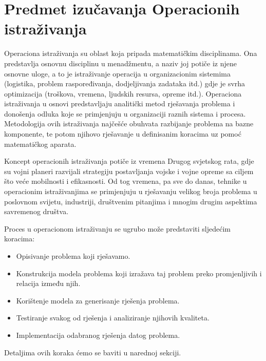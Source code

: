 \documentclass[a4paper, utf8, 11pt, colorlinks]{book}
\theoremstyle{definition}
\begin{document}
\chapter{Predmet izučavanja Operacionih istraživanja}


Operaciona istraživanja su oblast koja pripada matematičkim disciplinama. Ona predstavlja osnovnu disciplinu u menadžmentu, a naziv joj potiče iz njene osnovne uloge, a to je istraživanje  operacija u organizacionim sistemima (logistika, problem raspoređivanja, dodjeljivanja zadataka itd.) gdje je svrha optimizacija (troškova, vremena, ljudskih resursa, opreme itd.). Operaciona istraživanja u osnovi predstavljaju analitički metod rješavanja problema i donošenja odluka koje se primjenjuju u organizaciji raznih sistema i procesa. Metodologija ovih istraživanja  najčešće obuhvata razbijanje problema na bazne komponente, te potom njihovo rješavanje u definisanim koracima uz pomoć matematičkog aparata. 


Koncept operacionih istraživanja potiče iz vremena Drugog svjetskog rata, gdje su vojni planeri razvijali strategiju postavljanja vojske i vojne opreme sa ciljem što veće mobilnosti i efikasnosti. Od tog vremena, pa sve do danas, tehnike u operacionim istraživanjima se primjenjuju u rješavanju velikog broja problema u poslovnom svijetu, industriji, društvenim pitanjima i mnogim drugim aspektima savremenog društva. 


Proces u operacionom istraživanju se ugrubo može predstaviti sljedećim koracima:
\begin{itemize}
    \item Opisivanje problema koji rješavamo.
    \item Konstrukcija modela problema koji izražava taj problem preko promjenljivih i relacija između njih. 
    \item Korištenje modela za generisanje rješenja problema.
    \item Testiranje svakog od rješenja i analiziranje njihovih  kvaliteta.
    \item Implementacija odabranog rješenja datog problema. 
\end{itemize}

Detaljima ovih koraka ćemo se baviti  u narednoj sekciji.
 
\end{document}
